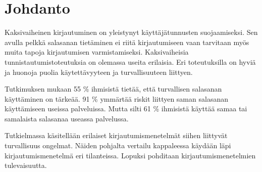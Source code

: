\chapter{Johdanto\label{johdanto}}

Kaksivaiheinen kirjautuminen on yleistynyt käyttäjätunnusten suojaamiseksi. Sen avulla pelkkä salasanan tietäminen ei riitä kirjautumiseen vaan tarvitaan myös muita tapoja kirjautumisen varmistamiseksi. Kaksivaiheisia tunnistautumistoteutuksia on olemassa useita erilaisia. Eri toteutuksilla on hyviä ja huonoja puolia käytettävyyteen ja turvallisuuteen liittyen.

Tutkimuksen mukaan 55 \% ihmisistä tietää, että turvallisen salasanan käyttäminen on tärkeää. 91 \% ymmärtää riskit liittyen saman salasanan käyttämiseen useissa palveluissa. Mutta silti 61 \% ihmisistä käyttää samaa tai samalaista salasanaa useassa palvelussa. \cite{lastpass}

Tutkielmassa käsitellään erilaiset kirjautumismenetelmät siihen liittyvät turvallisuus ongelmat. Näiden pohjalta vertailu kappaleessa käydään läpi kirjautumismenetelmä eri tilanteissa. Lopuksi pohditaan kirjautumismenetelmien tulevaisuutta. 
